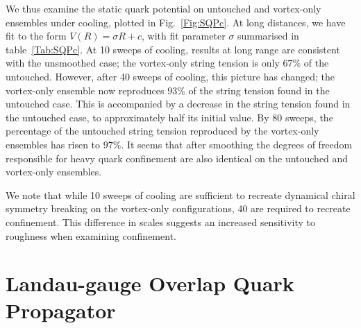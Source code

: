 \documentclass[
 reprint,
 amsmath,amssymb,
 aps,
prd,
]{revtex4-1}
\begin{document}
We thus examine the static quark potential on untouched and vortex-only ensembles under cooling, plotted in Fig.~\ref{Fig:SQPc}. At long distances, we have fit to the form $V(R) = \sigma R + c$, with fit parameter $\sigma$ summarised in table~\ref{Tab:SQPc}. At 10 sweeps of cooling, results at long range are consistent with the unsmoothed case; the vortex-only string tension is only $67\%$ of the untouched. However, after 40 sweeps of cooling, this picture has changed; the vortex-only ensemble now reproduces $93\%$ of the string tension found in the untouched case. This is accompanied by a decrease in the string tension found in the untouched case, to approximately half its initial value. By 80 sweeps, the percentage of the untouched string tension reproduced by the vortex-only ensembles has risen to $97\%$. It seems that after smoothing the degrees of freedom responsible for heavy quark confinement are also identical on the untouched and vortex-only ensembles.

We note that while 10 sweeps of cooling are sufficient to recreate dynamical chiral symmetry breaking on the vortex-only configurations, 40 are required to recreate confinement. This difference in scales suggests an increased sensitivity to roughness when examining confinement.

\section{Landau-gauge Overlap Quark Propagator}
\label{sec:QProp}
\end{document}
